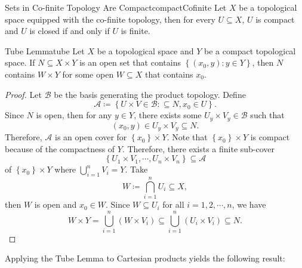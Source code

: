 \documentclass[math]{amznotes}
\theoremstyle{remark}
\begin{document}
\begin{probox}{Sets in Co-finite Topology Are Compact}{compactCofinite}
    Let $X$ be a topological space equipped with the co-finite topology, then for every $U \subseteq X$, $U$ is compact and $U$ is closed if and only if $U$ is finite.
\end{probox}
\begin{lembox}{Tube Lemma}{tube}
    Let $X$ be a topological space and $Y$ be a compact topological space. If $N \subseteq X \times Y$ is an open set that contains $\left\{\left(x_0, y\right) \colon y \in Y \right\}$, then $N$ contains $W \times Y$ for some open $W \subseteq X$ that contains $x_0$.
    \tcblower
    \begin{proof}
        Let $\mathcal{B}$ be the basis generating the product topology. Define 
        \begin{equation*}
            \mathcal{A} \coloneqq \left\{U \times V \in \mathcal{B} \colon \subseteq N, x_0 \in U\right\}.
        \end{equation*}
        Since $N$ is open, then for any $y \in Y$, there exists some $U_y \times V_y \in \mathcal{B}$ such that 
        \begin{equation*}
            \left(x_0, y\right) \in U_y \times V_y \subseteq N.
        \end{equation*}
        Therefore, $\mathcal{A}$ is an open cover for $\left\{x_0\right\} \times Y$. Note that $\left\{x_0\right\} \times Y$ is compact because of the compactness of $Y$. Therefore, there exists a finite sub-cover
        \begin{equation*}
            \left\{U_1 \times V_1, \cdots, U_n \times V_n\right\} \subseteq \mathcal{A}
        \end{equation*}
        of $\left\{x_0\right\} \times Y$ where $\bigcup_{i = 1}^nV_i = Y$. Take 
        \begin{equation*}
            W \coloneqq \bigcap_{i = 1}^nU_i \subseteq X,
        \end{equation*}
        then $W$ is open and $x_0 \in W$. Since $W \subseteq U_i$ for all $i = 1, 2, \cdots, n$, we have 
        \begin{equation*}
            W \times Y = \bigcup_{i = 1}^n\left(W \times V_i\right) \subseteq \bigcup_{i = 1}^n\left(U_i \times V_i\right) \subseteq N.
        \end{equation*}
    \end{proof}
\end{lembox}
Applying the Tube Lemma to Cartesian products yields the following result:
\end{document}
